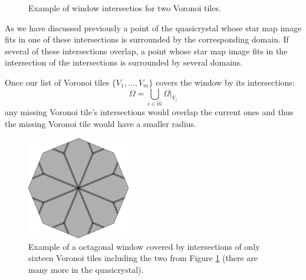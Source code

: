 \documentclass[text.tex]{subfiles}
\begin{document}
\begin{figure}[h!]
\begin{minipage}{0.4\textwidth}
\end{minipage}
\caption{Example of window intersectios for two Voronoi tiles. }
\label{fig_quasicrystalExampleIntersection}
\end{figure}

As we have discussed previously a point of the quasicrystal whose star map image fits in one of these intersections is surrounded by the corresponding domain. If several of these intersections overlap, a point whose star map image fits in the intersection of the intersections is surrounded by several domains. 

Once our list of Voronoi tiles $\{V_1,\dots,V_m\}$ covers the window by its intersections: 
$$\Omega = \bigcup\limits_{i\in\hat{m}}\Omega|_{V_i}$$
any missing Voronoi tile's intersections would overlap the current ones and thus the missing Voronoi tile would have a smaller radius. 

\begin{figure}[h!]
\centering
\includegraphics[width=0.4\textwidth]{img/2D/cover}
\caption{Example of a octagonal window covered by intersections of only sixteen Voronoi tiles including the two from Figure \ref{fig_quasicrystalExampleIntersection} (there are many more in the quasicrystal). }
\label{fig_quasicrystalExampleOctagon}
\end{figure}
\end{document}
